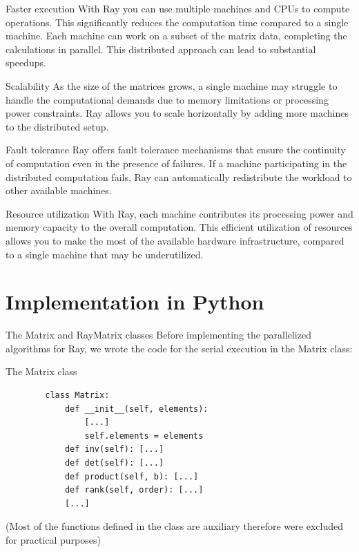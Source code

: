 \documentclass{beamer}
\begin{document}
\begin{frame}{Faster execution}
    With Ray you can use multiple machines and CPUs to compute operations. This significantly reduces the computation time compared to a single machine. Each machine can work on a subset of the matrix data, completing the calculations in parallel. This distributed approach can lead to substantial speedups.
\end{frame}

\begin{frame}{Scalability}
    As the size of the matrices grows, a single machine may struggle to handle the computational demands due to memory limitations or processing power constraints. Ray allows you to scale horizontally by adding more machines to the distributed setup.
\end{frame}

\begin{frame}{Fault tolerance}
    Ray offers fault tolerance mechanisms that ensure the continuity of computation even in the presence of failures. If a machine participating in the distributed computation fails, Ray can automatically redistribute the workload to other available machines.
\end{frame}

\begin{frame}{Resource utilization}
    With Ray, each machine contributes its processing power and memory capacity to the overall computation. This efficient utilization of resources allows you to make the most of the available hardware infrastructure, compared to a single machine that may be underutilized.
\end{frame}

\section{Implementation in Python}
\begin{frame}{The Matrix and RayMatrix classes}
    Before implementing the parallelized algorithms for Ray, we wrote the code for the serial execution in the \alert{Matrix} class:
\end{frame}

\begin{frame}[fragile]{The Matrix class}
    \begin{verbatim}
        class Matrix:
            def __init__(self, elements):
                [...]
                self.elements = elements
            def inv(self): [...]
            def det(self): [...]
            def product(self, b): [...]
            def rank(self, order): [...]
            [...]

    \end{verbatim}

    (Most of the functions defined in the class are auxiliary therefore were excluded for practical purposes)
\end{frame}
\end{document}
